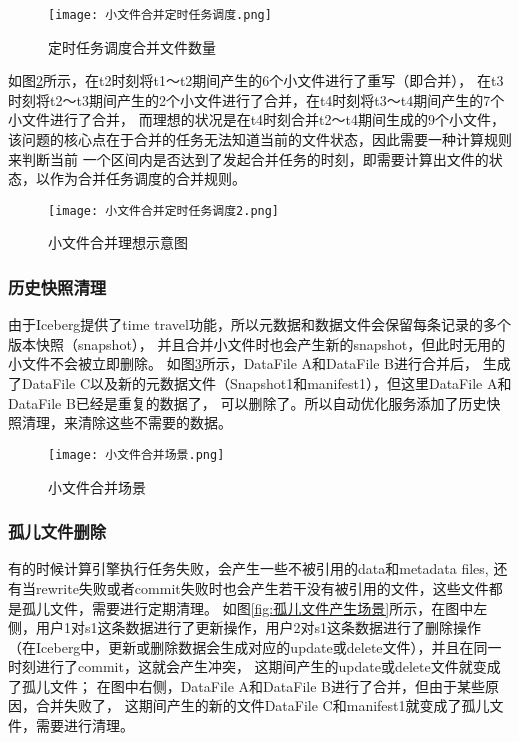 \begin{figure}[H]
  \centering
  \texttt{[image: 小文件合并定时任务调度.png]}
  \caption{定时任务调度合并文件数量}
  \label{fig:小文件合并定时任务调度}
\end{figure}

如图\ref{fig:小文件合并理想示意图}所示，在t2时刻将t1～t2期间产生的6个小文件进行了重写（即合并），
在t3时刻将t2～t3期间产生的2个小文件进行了合并，在t4时刻将t3～t4期间产生的7个小文件进行了合并，
而理想的状况是在t4时刻合并t2～t4期间生成的9个小文件，
该问题的核心点在于合并的任务无法知道当前的文件状态，因此需要一种计算规则来判断当前
一个区间内是否达到了发起合并任务的时刻，即需要计算出文件的状态，以作为合并任务调度的合并规则。

\begin{figure}[H]
  \centering
  \texttt{[image: 小文件合并定时任务调度2.png]}
  \caption{小文件合并理想示意图}
  \label{fig:小文件合并理想示意图}
\end{figure}

\subsubsection{历史快照清理}

由于Iceberg提供了time travel功能，所以元数据和数据文件会保留每条记录的多个版本快照（snapshot），
并且合并小文件时也会产生新的snapshot，但此时无用的小文件不会被立即删除。
如图\ref{fig:小文件合并场景}所示，DataFile A和DataFile B进行合并后，
生成了DataFile C以及新的元数据文件（Snapshot1和manifest1），但这里DataFile A和DataFile B已经是重复的数据了，
可以删除了。所以自动优化服务添加了历史快照清理，来清除这些不需要的数据。

\begin{figure}[H]
  \centering
  \texttt{[image: 小文件合并场景.png]}
  \caption{小文件合并场景}
  \label{fig:小文件合并场景}
\end{figure}

\subsubsection{孤儿文件删除}

有的时候计算引擎执行任务失败，会产生一些不被引用的data和metadata files,
还有当rewrite失败或者commit失败时也会产生若干没有被引用的文件，这些文件都是孤儿文件，需要进行定期清理。
如图\ref{fig:孤儿文件产生场景}所示，在图中左侧，用户1对s1这条数据进行了更新操作，用户2对s1这条数据进行了删除操作
（在Iceberg中，更新或删除数据会生成对应的update或delete文件），并且在同一时刻进行了commit，这就会产生冲突，
这期间产生的update或delete文件就变成了孤儿文件；
在图中右侧，DataFile A和DataFile B进行了合并，但由于某些原因，合并失败了，
这期间产生的新的文件DataFile C和manifest1就变成了孤儿文件，需要进行清理。

